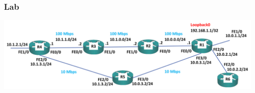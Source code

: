 \documentclass[pdflatex,compress,mathserif]{beamer}
\begin{document}
\begin{frame}
	\frametitle{Lab}
	\begin{center}
		\includegraphics[width=\linewidth]{img/img41}
	\end{center}
\end{frame}
\end{document}
